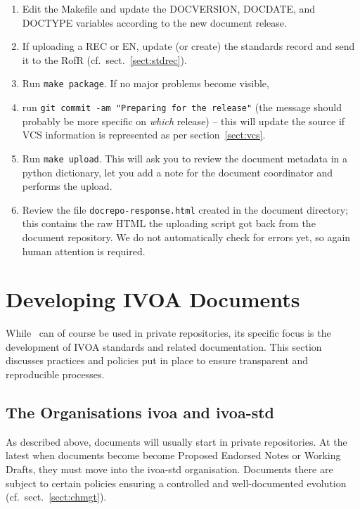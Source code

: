 \documentclass[11pt,a4paper]{ivoa}
\begin{document}
\begin{enumerate}
\item Edit the Makefile and update the DOCVERSION, DOCDATE, and DOCTYPE
variables according to the new document release.

\item If uploading a REC or EN, update (or create) the standards record
and send it to the RofR (cf.~sect.~\ref{sect:stdrec}).

\item Run \verb|make package|.  If no major problems become visible,

\item run \verb|git commit -am "Preparing for the release"| (the message
should probably be more specific on \textit{which} release) -- this
will update the source if VCS information is represented as per
section~\ref{sect:vcs}.

\item Run \verb|make upload|.  This will ask you to review the document
metadata in a python dictionary, let you add a note for the document
coordinator and performs the upload.

\item Review the file \texttt{docrepo-response.html} created in the
document directory; this contains the raw HTML the uploading script got
back from the document repository.  We do not automatically check for
errors yet, so again human attention is required.
\end{enumerate}


\section{Developing IVOA Documents}
\label{sect:ivoapol}

While \ivoatex\ can of course be used in private repositories, its
specific focus is the development of IVOA standards and related
documentation.  This section discusses practices and policies put in
place to ensure transparent and reproducible processes.

\subsection{The Organisations ivoa and ivoa-std}

As described above, documents will usually start in private
repositories.  At the latest when documents become become Proposed
Endorsed Notes or Working Drafts, they must move into the ivoa-std
organisation.  Documents there are subject to certain policies ensuring
a controlled and well-documented evolution (cf.~sect.~\ref{sect:chmgt}).
\end{document}
